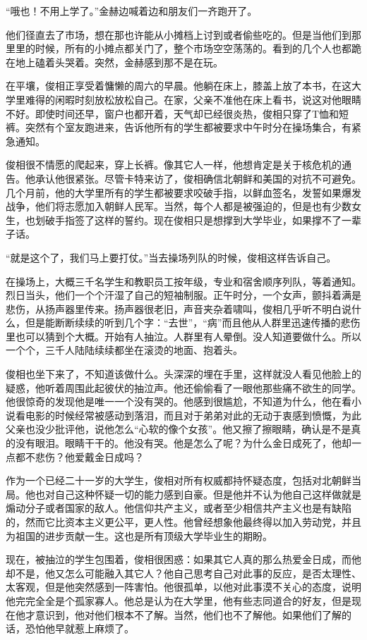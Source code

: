 “哦也！不用上学了。”金赫边喊着边和朋友们一齐跑开了。

他们径直去了市场，想在那也许能从小摊档上讨到或者偷些吃的。但是当他们到那里里的时候，所有的小摊点都关门了，整个市场空空荡荡的。看到的几个人也都跪在地上磕着头哭着。突然，金赫感到那不是在玩。

在平壤，俊相正享受着慵懒的周六的早晨。他躺在床上，膝盖上放了本书，在这大学里难得的闲暇时刻放松放松自己。在家，父亲不准他在床上看书，说这对他眼睛不好。即使时间还早，窗户也都开着，天气却已经很炎热，俊相只穿了T恤和短裤。突然有个室友跑进来，告诉他所有的学生都被要求中午时分在操场集合，有紧急通知。

俊相很不情愿的爬起来，穿上长裤。像其它人一样，他想肯定是关于核危机的通告。他承认他很紧张。尽管卡特来访了，俊相确信北朝鲜和美国的对抗不可避免。几个月前，他的大学里所有的学生都被要求咬破手指，以鲜血签名，发誓如果爆发战争，他们将志愿加入朝鲜人民军。当然，每个人都是被强迫的，但是也有少数女生，也划破手指签了这样的誓约。现在俊相只是想撑到大学毕业，如果撑不了一辈子话。

“就是这个了，我们马上要打仗。”当去操场列队的时候，俊相这样告诉自己。

在操场上，大概三千名学生和教职员工按年级，专业和宿舍顺序列队，等着通知。烈日当头，他们一个个汗湿了自己的短袖制服。正午时分，一个女声，颤抖着满是悲伤，从扬声器里传来。扬声器很老旧，声音夹杂着啸叫，俊相几乎听不明白说什么，但是能断断续续的听到几个字：“去世”，“病”而且他从人群里迅速传播的悲伤里也可以猜到个大概。开始有人抽泣。人群里有人晕倒。没人知道要做什么。所以一个个，三千人陆陆续续都坐在滚烫的地面、抱着头。

俊相也坐下来了，不知道该做什么。头深深的埋在手里，这样就没人看见他脸上的疑惑，他听着周围此起彼伏的抽泣声。他还偷偷看了一眼他那些痛不欲生的同学。他很惊奇的发现他是唯一一个没有哭的。他感到很尴尬，不知道为什么，他在看小说看电影的时候经常被感动到落泪，而且对于弟弟对此的无动于衷感到愤慨，为此父亲也没少批评他，说他怎么“心软的像个女孩”。他又擦了擦眼睛，确认是不是真的没有眼泪。眼睛干干的。他没有哭。他是怎么了呢？为什么金日成死了，他却一点都不悲伤？他爱戴金日成吗？

作为一个已经二十一岁的大学生，俊相对所有权威都持怀疑态度，包括对北朝鲜当局。他也对自己这种怀疑一切的能力感到自豪。但是他并不认为他自己这样做就是煽动分子或者国家的敌人。他信仰共产主义，或者至少相信共产主义也是有缺陷的，然而它比资本主义更公平，更人性。他曾经想象他最终得以加入劳动党，并且为祖国的进步贡献一生。这也是所有顶级大学毕业生的期盼。

现在，被抽泣的学生包围着，俊相很困惑：如果其它人真的那么热爱金日成，而他却不是，他又怎么可能融入其它人？他自己思考自己对此事的反应，是否太理性、太客观，但是他突然感到一阵害怕。他很孤单，以他对此事漠不关心的态度，说明他完完全全是个孤家寡人。他总是认为在大学里，他有些志同道合的好友，但是现在他才意识到，他对他们根本不了解。当然，他们也不了解他。如果他们了解的话，恐怕他早就惹上麻烦了。

